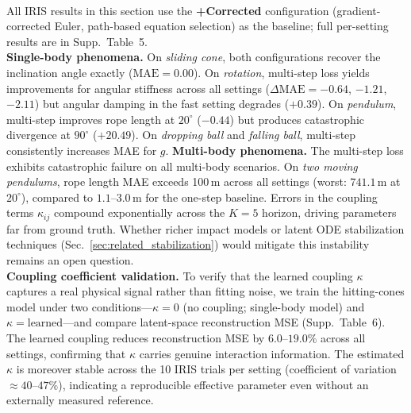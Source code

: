 \documentclass[runningheads]{llncs}
\begin{document}
\\
\noindent
All IRIS results in this section use the \textbf{+Corrected} configuration (gradient-corrected Euler, path-based equation selection) as the baseline; full per-setting results are in Supp.\ Table~5.
\\
\noindent
\textbf{Single-body phenomena.} On \emph{sliding cone}, both configurations recover the inclination angle exactly ($\mathrm{MAE} = 0.00$). On \emph{rotation}, multi-step loss yields improvements for angular stiffness across all settings ($\Delta\mathrm{MAE} = -0.64$, $-1.21$, $-2.11$) but angular damping in the fast setting degrades ($+0.39$). On \emph{pendulum}, multi-step improves rope length at $20^\circ$ ($-0.44$) but produces catastrophic divergence at $90^\circ$ ($+20.49$). On \emph{dropping ball} and \emph{falling ball}, multi-step consistently increases MAE for $g$.
\textbf{Multi-body phenomena.} The multi-step loss exhibits catastrophic failure on all multi-body scenarios. On \emph{two moving pendulums}, rope length MAE exceeds 100\,m across all settings (worst: $741.1$\,m at $20^\circ$), compared to $1.1$--$3.0$\,m for the one-step baseline. Errors in the coupling terms $\kappa_{ij}$ compound exponentially across the $K{=}5$ horizon, driving parameters far from ground truth. Whether richer impact models or latent ODE stabilization techniques (Sec.~\ref{sec:related_stabilization}) would mitigate this instability remains an open question.
\\
\noindent
\textbf{Coupling coefficient validation.} To verify that the learned coupling $\kappa$ captures a real physical signal rather than fitting noise, we train the hitting-cones model under two conditions---$\kappa{=}0$ (no coupling; single-body model) and $\kappa{=}\text{learned}$---and compare latent-space reconstruction MSE (Supp.\ Table~6). The learned coupling reduces reconstruction MSE by $6.0$--$19.0\%$ across all settings, confirming that $\kappa$ carries genuine interaction information. The estimated $\kappa$ is moreover stable across the 10 IRIS trials per setting (coefficient of variation ${\approx}40$--$47\%$), indicating a reproducible effective parameter even without an externally measured reference.







\end{document}
